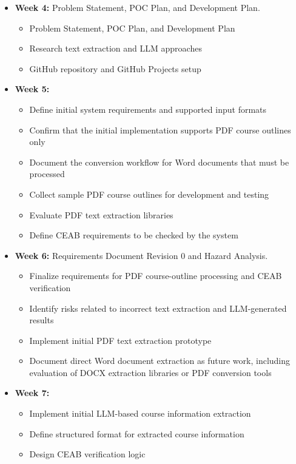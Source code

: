 \documentclass{article}
\begin{document}
\begin{itemize}
\item \textbf{Week 4:} Problem Statement, POC Plan, and Development Plan.
  \begin{itemize}
    \item Problem Statement, POC Plan, and Development Plan
    \item Research text extraction and LLM approaches
    \item GitHub repository and GitHub Projects setup
  \end{itemize}

\item \textbf{Week 5:}
  \begin{itemize}
    \item Define initial system requirements and supported input formats
    \item Confirm that the initial implementation supports PDF course outlines only
    \item Document the conversion workflow for Word documents that must be processed
    \item Collect sample PDF course outlines for development and testing
    \item Evaluate PDF text extraction libraries
    \item Define CEAB requirements to be checked by the system
  \end{itemize}

\item \textbf{Week 6:} Requirements Document Revision 0 and Hazard Analysis.
\begin{itemize}
  \item Finalize requirements for PDF course-outline processing and CEAB verification
  \item Identify risks related to incorrect text extraction and LLM-generated results
  \item Implement initial PDF text extraction prototype
  \item Document direct Word document extraction as future work, including
        evaluation of DOCX extraction libraries or PDF conversion tools
\end{itemize}

\item \textbf{Week 7:}
  \begin{itemize}
    \item Implement initial LLM-based course information extraction
    \item Define structured format for extracted course information
    \item Design CEAB verification logic
  \end{itemize}


\end{itemize}
\end{document}
